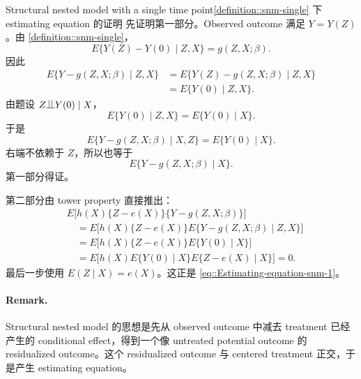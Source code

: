\begin{exercisesolution}{Structural nested model with a single time point}{\cref{definition::snm-single} 下 estimating equation 的证明}
先证明第一部分。Observed outcome 满足 $Y=Y(Z)$。由 \cref{definition::snm-single}，
\[
E\{Y(Z)-Y(0)\mid Z,X\}=g(Z,X;\beta).
\]
因此
\begin{align*}
E\{Y-g(Z,X;\beta)\mid Z,X\}
&=
E\{Y(Z)-g(Z,X;\beta)\mid Z,X\}\\
&=
E\{Y(0)\mid Z,X\}.
\end{align*}
由题设 $Z\ind Y(0)\mid X$，
\[
E\{Y(0)\mid Z,X\}=E\{Y(0)\mid X\}.
\]
于是
\[
E\{Y-g(Z,X;\beta)\mid X,Z\}
=E\{Y(0)\mid X\}.
\]
右端不依赖于 $Z$，所以也等于
\[
E\{Y-g(Z,X;\beta)\mid X\}.
\]
第一部分得证。

第二部分由 tower property 直接推出：
\begin{align*}
&E\Big[h(X)\{Z-e(X)\}\{Y-g(Z,X;\beta)\}\Big]\\
&\quad =
E\Big[
h(X)\{Z-e(X)\}
E\{Y-g(Z,X;\beta)\mid Z,X\}
\Big]\\
&\quad =
E\Big[
h(X)\{Z-e(X)\}E\{Y(0)\mid X\}
\Big]\\
&\quad =
E\Big[
h(X)E\{Y(0)\mid X\}
E\{Z-e(X)\mid X\}
\Big]
=0.
\end{align*}
最后一步使用 $E(Z\mid X)=e(X)$。这正是 \cref{eq::Estimating-equation-snm-1}。

\paragraph{Remark.}
Structural nested model 的思想是先从 observed outcome 中减去 treatment 已经产生的 conditional effect，得到一个像 untreated potential outcome 的 residualized outcome。这个 residualized outcome 与 centered treatment 正交，于是产生 estimating equation。
\end{exercisesolution}

